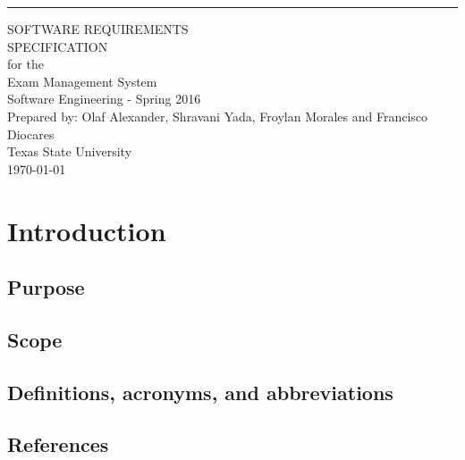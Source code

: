 \documentclass{scrreprt}
\date{}
\begin{document}
\begin{flushleft}
    \rule{16cm}{5pt}\vskip1cm
    \begin{bfseries}
        \Huge{SOFTWARE REQUIREMENTS\\ SPECIFICATION}\\
        \vspace{1.0cm}
        for the\\
        \vspace{1.0cm}
        Exam Management System\\
        \vspace{1.0cm}
        \LARGE{Software Engineering - Spring 2016}\\
        \vspace{1.0cm}
        Prepared by: Olaf Alexander, Shravani Yada, Froylan Morales and Francisco Diocares\\
        \vspace{1.0cm}
        Texas State University\\
        \vspace{1.0cm}
        \today\\
    \end{bfseries}
\end{flushleft}

\tableofcontents

\chapter{Introduction}

\section{Purpose}


\section{Scope}



\section{Definitions, acronyms, and abbreviations}



\section{References}

\end{document}
